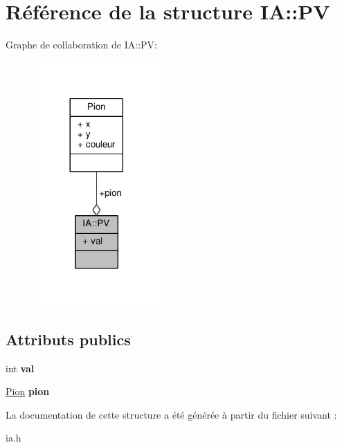 \hypertarget{structIA_1_1PV}{}\section{Référence de la structure IA\+:\+:PV}
\label{structIA_1_1PV}


Graphe de collaboration de IA\+:\+:PV\+:\nopagebreak
\begin{figure}[H]
\begin{center}
\leavevmode
\includegraphics[width=137pt]{structIA_1_1PV__coll__graph}
\end{center}
\end{figure}
\subsection*{Attributs publics}
\begin{DoxyCompactItemize}
\item 
int {\bfseries val}\hypertarget{structIA_1_1PV_ad3a056627bcb61cbc44ea37f00ba6c6d}{}\label{structIA_1_1PV_ad3a056627bcb61cbc44ea37f00ba6c6d}

\item 
\hyperlink{structPion}{Pion} {\bfseries pion}\hypertarget{structIA_1_1PV_ad36e933f2e4936c2ed19138666c48859}{}\label{structIA_1_1PV_ad36e933f2e4936c2ed19138666c48859}

\end{DoxyCompactItemize}


La documentation de cette structure a été générée à partir du fichier suivant \+:\begin{DoxyCompactItemize}
\item 
ia.\+h\end{DoxyCompactItemize}
